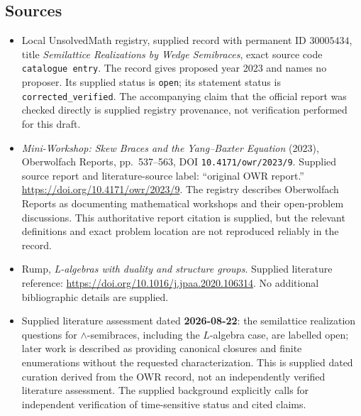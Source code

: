\documentclass[11pt]{article}
\begin{document}
\subsection{Sources}
\begin{itemize}
\item Local UnsolvedMath registry, supplied record with permanent ID \(30005434\), title \emph{Semilattice Realizations by Wedge Semibraces}, exact source code \texttt{catalogue entry}. The record gives proposed year 2023 and names no proposer. Its supplied status is \texttt{open}; its statement status is \texttt{corrected\_verified}. The accompanying claim that the official report was checked directly is supplied registry provenance, not verification performed for this draft.
\item \emph{Mini-Workshop: Skew Braces and the Yang--Baxter Equation} (2023), Oberwolfach Reports, pp.\ 537--563, DOI \texttt{10.4171/owr/2023/9}. Supplied source report and literature-source label: ``original OWR report.'' \url{https://doi.org/10.4171/owr/2023/9}. The registry describes Oberwolfach Reports as documenting mathematical workshops and their open-problem discussions. This authoritative report citation is supplied, but the relevant definitions and exact problem location are not reproduced reliably in the record.
\item Rump, \emph{L-algebras with duality and structure groups}. Supplied literature reference: \url{https://doi.org/10.1016/j.jpaa.2020.106314}. No additional bibliographic details are supplied.
\item Supplied literature assessment dated \textbf{2026-08-22}: the semilattice realization questions for \(\wedge\)-semibraces, including the \(L\)-algebra case, are labelled open; later work is described as providing canonical closures and finite enumerations without the requested characterization. This is supplied dated curation derived from the OWR record, not an independently verified literature assessment. The supplied background explicitly calls for independent verification of time-sensitive status and cited claims.
\end{itemize}
\end{document}
